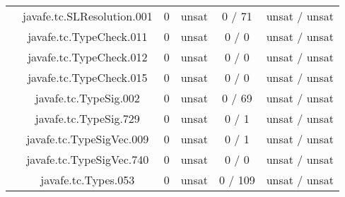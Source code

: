 \begin{table}[htbp]
\begin{minipage}{0.60\textwidth}
{\begin{tabular}[c]{c c!{\vrule width 1.5pt}c|c!{\vrule width 1.5pt}c|c|}
 			& javafe.tc.SLResolution.001		   		      & 0    & unsat   & 0  / 71   & unsat / unsat   \\
 			& javafe.tc.TypeCheck.011		   		      & 0    & unsat   & 0  / 0    & unsat / unsat   \\
 			& javafe.tc.TypeCheck.012		   		      & 0    & unsat   & 0  / 0    & unsat / unsat   \\
 			& javafe.tc.TypeCheck.015		   		      & 0    & unsat   & 0  / 0    & unsat / unsat   \\
		 	& javafe.tc.TypeSig.002		    			      & 0    & unsat   & 0  / 69   & unsat / unsat   \\
		 	& javafe.tc.TypeSig.729		    			      & 0    & unsat   & 0  / 1    & unsat / unsat   \\
 			& javafe.tc.TypeSigVec.009		   		      & 0    & unsat   & 0  / 1    & unsat / unsat   \\
 			& javafe.tc.TypeSigVec.740		   		      & 0    & unsat   & 0  / 0    & unsat / unsat   \\
		 	& javafe.tc.Types.053		    			      & 0    & unsat   & 0  / 109  & unsat / unsat   \\

\end{tabular}}
\end{minipage}
\end{table}
